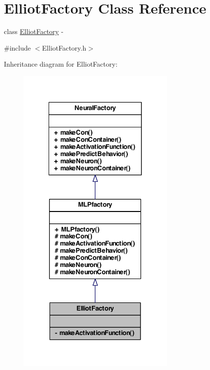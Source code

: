 \hypertarget{class_elliot_factory}{
\section{ElliotFactory Class Reference}
\label{class_elliot_factory}
}


class \hyperlink{class_elliot_factory}{ElliotFactory} -\/  




{\ttfamily \#include $<$ElliotFactory.h$>$}



Inheritance diagram for ElliotFactory:
\nopagebreak
\begin{figure}[H]
\begin{center}
\leavevmode
\includegraphics[width=222pt]{class_elliot_factory__inherit__graph}
\end{center}
\end{figure}



